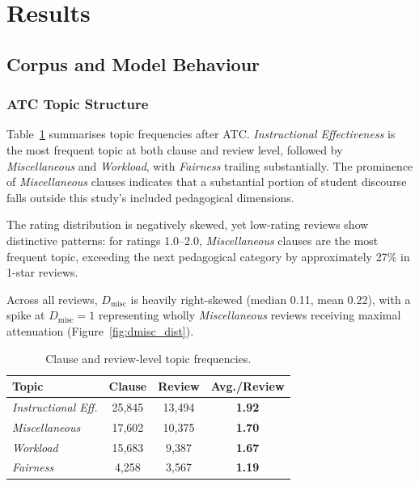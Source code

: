 \documentclass[fleqn,10pt]{JLA_article}
\begin{document}
\section{Results}

\subsection{Corpus and Model Behaviour}

\subsubsection{ATC Topic Structure}

Table~\ref{tab:clause_review_freq} summarises topic frequencies after ATC. \textit{Instructional Effectiveness} is the most frequent topic at both clause and review level, followed by \textit{Miscellaneous} and \textit{Workload}, with \textit{Fairness} trailing substantially. The prominence of \textit{Miscellaneous} clauses indicates that a substantial portion of student discourse falls outside this study's included pedagogical dimensions.

The rating distribution is negatively skewed, yet low-rating reviews show distinctive patterns: for ratings 1.0--2.0, \textit{Miscellaneous} clauses are the most frequent topic, exceeding the next pedagogical category by approximately 27\% in 1-star reviews.


Across all reviews, $D_{\text{misc}}$ is heavily right-skewed (median 0.11, mean 0.22), with a spike at $D_{\text{misc}}=1$ representing wholly \textit{Miscellaneous} reviews receiving maximal attenuation (Figure~\ref{fig:dmisc_dist}).

\begin{table}[htbp]
\centering
\caption{Clause and review-level topic frequencies.}
\label{tab:clause_review_freq}
\small
\begin{tabular}{lccc}
\toprule
\textbf{Topic} & \textbf{Clause} & \textbf{Review} & \textbf{Avg./Review} \\
\midrule
\textit{Instructional Eff.} & 25,845 & 13,494 & \textbf{1.92} \\
\textit{Miscellaneous} & 17,602 & 10,375 & \textbf{1.70} \\
\textit{Workload} & 15,683 & 9,387 & \textbf{1.67} \\
\textit{Fairness} & 4,258 & 3,567 & \textbf{1.19} \\
\bottomrule
\end{tabular}
\end{table}
\end{document}
